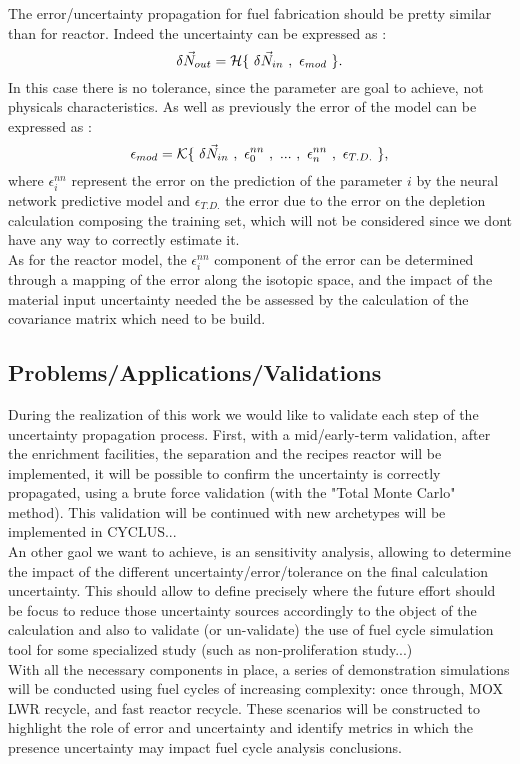 \documentclass[dvips,12pt]{article}
\begin{document}
The error/uncertainty propagation for fuel
fabrication should be pretty similar than for
reactor. Indeed the uncertainty can be expressed
as :
\begin{equation}
\delta \vec{N}_{out} = {\cal H}\{~\delta\vec{N}_{in}~,~\epsilon_{mod}~\}.
\end{equation}
In this case there is no tolerance, since the
parameter are goal to achieve, not physicals
characteristics. As well as previously the error
of the model can be expressed as :
\begin{equation}
\epsilon_{mod} = {\cal K}\{~\delta\vec{N}_{in}~,~\epsilon^{nn}_{0}~,~...~,~\epsilon^{nn}_{n}~,~\epsilon_{T.D.}~\},
\end{equation}
 where $\epsilon^{nn}_{i}$ represent the error on
 the prediction of the parameter $i$ by the neural
 network predictive model and $\epsilon_{T.D.}$
 the error due to the error on the depletion
 calculation composing the training set, which
 will not be considered since we dont have any way
 to correctly estimate it.\\
 
 As for the reactor model, the $\epsilon^{nn}_{i}$
 component of the error can be determined through
 a mapping of the error along the isotopic space,
 and the impact of the material input uncertainty
 needed the be assessed by the calculation of the
 covariance matrix which need to be build.

\subsection{Problems/Applications/Validations}
During the realization of this work we would like
to validate each step of the uncertainty
propagation process. First, with a mid/early-term
validation, after the enrichment facilities, the
separation and the recipes reactor will be
implemented, it will be possible to confirm the
uncertainty is correctly propagated, using a brute
force validation (with the "Total Monte Carlo"
method). This validation will be continued with
new archetypes will be implemented in CYCLUS...\\
An other gaol we want to achieve, is an
sensitivity analysis, allowing to determine the
impact of the different
uncertainty/error/tolerance on the final
calculation uncertainty. This should allow to
define precisely where the future effort should be
focus to reduce those uncertainty sources
accordingly to the object of the calculation and
also to validate (or un-validate) the use of fuel
cycle simulation tool for some specialized study
(such as non-proliferation study...)\\
With all the necessary components in place, a
series of demonstration simulations will be
conducted using fuel cycles of increasing
complexity: once through, MOX LWR recycle, and
fast reactor recycle.  These scenarios will be
constructed to highlight the role of error and
uncertainty and identify metrics in which the
presence uncertainty may impact fuel cycle
analysis conclusions.
\end{document}

